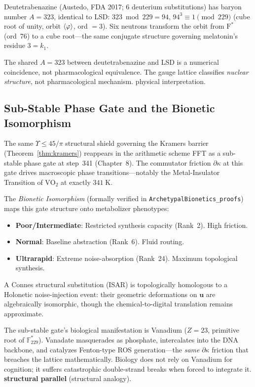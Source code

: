 \begin{result}
\label{res:deuterium}
Deutetrabenazine (Austedo, FDA 2017; 6 deuterium substitutions) has baryon number $A = 323$, identical to LSD: $323 \bmod 229 = 94$, $94^3 \equiv 1 \pmod{229}$ (cube root of unity, orbit $\langle\varphi\rangle$, ord $= 3$). Six neutrons transform the orbit from $\mathrm{F}^*$ (ord~76) to a cube root---the same conjugate structure governing melatonin's residue $3 = k_1$.
\end{result}

\begin{remark}
The shared $A = 323$ between deutetrabenazine and LSD is a numerical coincidence, not pharmacological equivalence. The gauge lattice classifies \emph{nuclear structure}, not pharmacological mechanism. physical interpretation.
\end{remark}

\subsection{Sub-Stable Phase Gate and the Bionetic Isomorphism}

The same $\Upsilon \leq 45/\pi$ structural shield governing the Kramers barrier (Theorem~\ref{thm:kramers}) reappears in the arithmetic scheme FFT as a sub-stable phase gate at step~341 (Chapter~8). The commutator friction $\partial \kappa$ at this gate drives macroscopic phase transitions---notably the Metal-Insulator Transition of $\mathrm{VO}_2$ at exactly $341\;\mathrm{K}$.

The \emph{Bionetic Isomorphism} (formally verified in \texttt{ArchetypalBionetics\_proofs}) maps this gate structure onto metabolizer phenotypes:
\begin{itemize}[noitemsep]
  \item \textbf{Poor/Intermediate}: Restricted synthesis capacity (Rank~2). High friction.
  \item \textbf{Normal}: Baseline abstraction (Rank~6). Fluid routing.
  \item \textbf{Ultrarapid}: Extreme noise-absorption (Rank~24). Maximum topological synthesis.
\end{itemize}
A Connes structural substitution (ISAR) is topologically homologous to a Holonetic noise-injection event: their geometric deformations on $\mathbf{u}$ are algebraically isomorphic, though the chemical-to-digital translation remains approximate.

The sub-stable gate's biological manifestation is Vanadium ($Z=23$, primitive root of $\mathbb{F}_{229}^*$). Vanadate masquerades as phosphate, intercalates into the DNA backbone, and catalyzes Fenton-type ROS generation---the \emph{same} $\partial \kappa$ friction that breaches the lattice mathematically. Biology does not rely on Vanadium for cognition; it suffers catastrophic double-strand breaks when forced to integrate it. \textbf{structural parallel} (structural analogy).

